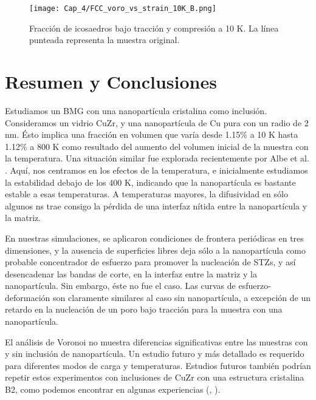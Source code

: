 \begin{figure}[htp]
\centering
\texttt{[image: Cap\_4/FCC\_voro\_vs\_strain\_10K\_B.png]}
\caption[Fracción de icosaedros a 10K]{Fracción de icosaedros bajo tracción y compresión a 10 K. La línea punteada representa la muestra original.}
\label{C4:fg:fcc_voro_10K}
\end{figure}

\section{Resumen y Conclusiones}
\label{S4_4}

Estudiamos un BMG con una nanopartícula cristalina como inclusión. Consideramos un vidrio CuZr, y una nanopartícula de Cu pura con un radio de 2 nm. Ésto implica una fracción en volumen que varía desde 1.15\% a 10 K hasta 1.12\% a 800 K como resultado del aumento del volumen inicial de la muestra con la temperatura. Una situación similar fue explorada recientemente por Albe et al. \cite{albe13}. Aquí, nos centramos en los efectos de la temperatura, e inicialmente estudiamos la estabilidad debajo de los 400 K, indicando que la nanopartícula es bastante estable a esas temperaturas. A temperaturas mayores, la difusividad en sólo algunos ns trae consigo la pérdida de una interfaz nítida entre la nanopartícula y la matriz.

En nuestras simulaciones, se aplicaron condiciones de frontera periódicas en tres dimensiones, y la ausencia de superficies libres deja sólo a la nanopartícula como probable concentrador de esfuerzo para promover la nucleación de STZs, y así desencadenar las bandas de corte, en la interfaz entre la matriz y la nanopartícula. Sin embargo, éste no fue el caso. Las curvas de esfuerzo-deformación son claramente similares al caso sin nanopartícula, a excepción de un retardo en la nucleación de un poro bajo tracción para la muestra con una nanopartícula.

El análisis de Voronoi no muestra diferencias significativas entre las muestras con y sin inclusión de nanopartícula. Un estudio futuro y más detallado es requerido para diferentes modos de carga y temperaturas. Estudios futuros también podrían repetir estos experimentos con inclusiones de CuZr con una estructura cristalina B2, como podemos encontrar en algunas experiencias (\cite{wei14}, \cite{kuo14}).